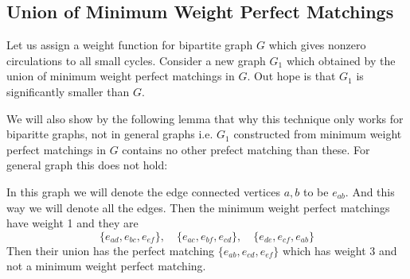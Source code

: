 \subsection{Union of Minimum Weight Perfect Matchings}
Let us assign a weight function for bipartite graph $G$ which gives nonzero circulations to all small cycles. Consider a new graph $G_1$ which obtained by the union of minimum weight perfect matchings in $G$. Out hope is that $G_1$ is significantly smaller than $G$.

We will also show by the following lemma that why this technique only works for biparitte graphs, not in general graphs i.e. $G_1$ constructed from minimum weight perfect matchings in $G$ contains no other prefect matching than these. For general graph this does not hold:

\begin{center}
	\begin{minipage}{0.3\textwidth}
		\begin{center}
		\end{center}
	\end{minipage}\hspace{1cm}
	\begin{minipage}{0.6\textwidth}
		In this graph we will denote the edge connected vertices $a,b$ to be $e_{ab}$. And this way we will denote all the edges. Then the minimum weight perfect matchings have weight 1 and they are $$\{e_{ad},e_{bc},e_{ef}\}, \quad \{e_{ac}, e_{bf}, e_{cd}\},\quad \{e_{de}, e_{cf}, e_{ab}\}$$Then their union has the perfect matching $\{e_{ab},e_{cd},e_{ef}\}$ which has weight 3 and not a minimum weight perfect matching.
	\end{minipage}
\end{center}

